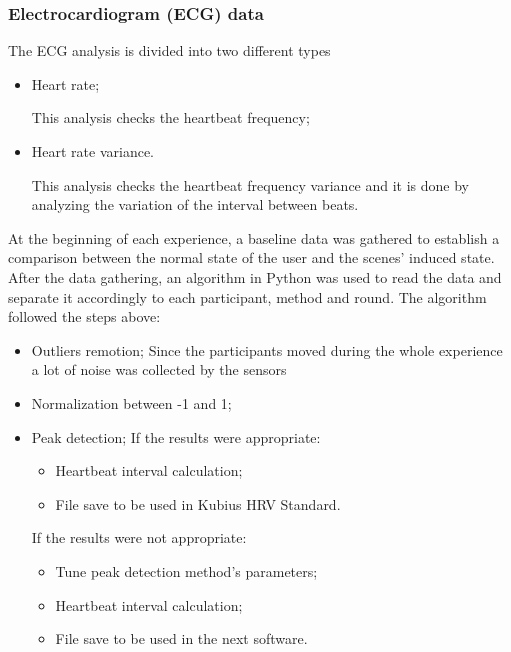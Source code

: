 \subsubsection{Electrocardiogram (ECG) data}
\label{subsec:results_ecg}

The ECG analysis is divided into two different types

\begin{itemize}
    \item Heart rate;
    
        This analysis checks the heartbeat frequency;

    \item Heart rate variance.
    
        This analysis checks the heartbeat frequency variance and it is done by analyzing the variation of the interval between beats.

\end{itemize}

At the beginning of each experience, a baseline data was gathered to establish a comparison between the normal state of the user and the scenes’ induced state. After the data gathering, an algorithm in Python was used to read the data and separate it accordingly to each participant, method and round. The algorithm followed the steps above:

\begin{itemize}
    \item Outliers remotion;
        Since the participants moved during the whole experience a lot of noise was collected by the sensors
    \item Normalization between -1 and 1;
    \item Peak detection;
        If the results were appropriate:
        \begin{itemize}
            \item Heartbeat interval calculation;
            \item File save to be used in Kubius HRV Standard.
        \end{itemize} 
        If the results were not appropriate:
        \begin{itemize}
            \item Tune peak detection method’s parameters;
            \item Heartbeat interval calculation;
            \item File save to be used in the next software.
        \end{itemize}    
\end{itemize}

